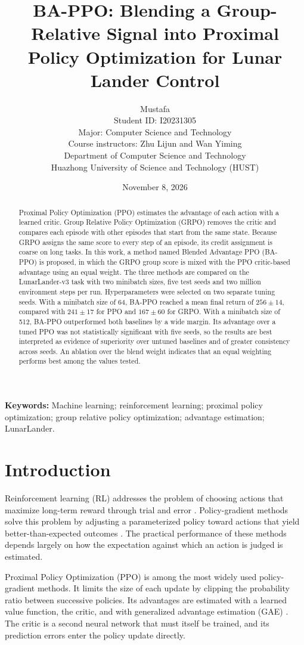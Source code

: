 \documentclass[11pt,a4paper]{article}
\title{BA-PPO: Blending a Group-Relative Signal into Proximal Policy Optimization for Lunar Lander Control}
\author{
  Mustafa \\
  Student ID: I20231305 \\
  Major: Computer Science and Technology \\
  Course instructors: Zhu Lijun and Wan Yiming \\
  Department of Computer Science and Technology \\
  Huazhong University of Science and Technology (HUST)
}
\date{November 8, 2026}
\begin{document}
\maketitle

\begin{abstract}
Proximal Policy Optimization (PPO) estimates the advantage of each action with a learned critic. Group Relative Policy Optimization (GRPO) removes the critic and compares each episode with other episodes that start from the same state. Because GRPO assigns the same score to every step of an episode, its credit assignment is coarse on long tasks. In this work, a method named Blended Advantage PPO (BA-PPO) is proposed, in which the GRPO group score is mixed with the PPO critic-based advantage using an equal weight. The three methods are compared on the LunarLander-v3 task with two minibatch sizes, five test seeds and two million environment steps per run. Hyperparameters were selected on two separate tuning seeds. With a minibatch size of 64, BA-PPO reached a mean final return of $256 \pm 14$, compared with $241 \pm 17$ for PPO and $167 \pm 60$ for GRPO. With a minibatch size of 512, BA-PPO outperformed both baselines by a wide margin. Its advantage over a tuned PPO was not statistically significant with five seeds, so the results are best interpreted as evidence of superiority over untuned baselines and of greater consistency across seeds. An ablation over the blend weight indicates that an equal weighting performs best among the values tested.
\end{abstract}

\noindent\textbf{Keywords:} Machine learning; reinforcement learning; proximal policy optimization; group relative policy optimization; advantage estimation; LunarLander.

\section{Introduction}
\label{sec:intro}

Reinforcement learning (RL) addresses the problem of choosing actions that maximize long-term reward through trial and error \cite{sutton2018rl}. Policy-gradient methods solve this problem by adjusting a parameterized policy toward actions that yield better-than-expected outcomes \cite{williams1992reinforce,sutton1999policygradient}. The practical performance of these methods depends largely on how the expectation against which an action is judged is estimated.

Proximal Policy Optimization (PPO) \cite{schulman2017ppo} is among the most widely used policy-gradient methods. It limits the size of each update by clipping the probability ratio between successive policies. Its advantages are estimated with a learned value function, the critic, and with generalized advantage estimation (GAE) \cite{schulman2016gae}. The critic is a second neural network that must itself be trained, and its prediction errors enter the policy update directly.
\end{document}
